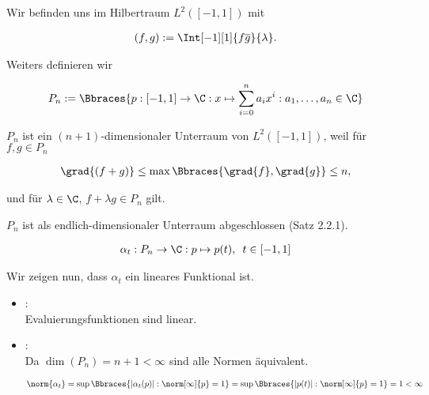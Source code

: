 \begin{solution}

Wir befinden uns im Hilbertraum $L^2([-1, 1])$ mit

\begin{align*}
  (f, g) := \Int[-1][1]{f \overline{g}}{\lambda}.
\end{align*}

Weiters definieren wir

\begin{align*}
  P_n := \Bbraces
  {
    p: [-1, 1] \to \C: x
    \mapsto \sum_{i=0}^n a_i x^i:
    a_1, \ldots, a_n \in \C
  }
\end{align*}

$P_n$ ist ein $(n+1)$-dimensionaler Unterraum von $L^2([-1, 1])$, weil für $f, g \in P_n$

\begin{align*}
  \grad{(f + g)}
  \leq
  \max \Bbraces{\grad{f}, \grad{g}}
  \leq n,
\end{align*}

und für $\lambda \in \C$, $f + \lambda g \in P_n$ gilt.


$P_n$ ist als endlich-dimensionaler Unterraum abgeschlossen (Satz 2.2.1).

\begin{align*}
  \alpha_t:
  P_n \to \C:
  p  \mapsto p(t),
  \enspace
  t \in [-1, 1]
\end{align*}

Wir zeigen nun, dass $\alpha_t$ ein lineares Funktional ist.

\begin{itemize}

  \item
  : \\

  Evaluierungsfunktionen sind linear.

  \item
  : \\

  Da $\dim(P_n) = n + 1 < \infty$ sind alle Normen äquivalent.

  \begin{align*}
    \norm{\alpha_t}
    =
    \sup \Bbraces
    {
      |\alpha_t(p)|:
      \norm[\infty]{p} = 1
    }
    =
    \sup \Bbraces
    {
      |p(t)|:
      \norm[\infty]{p} = 1
    }
    = 1 < \infty
  \end{align*}


\end{itemize}
\end{solution}
